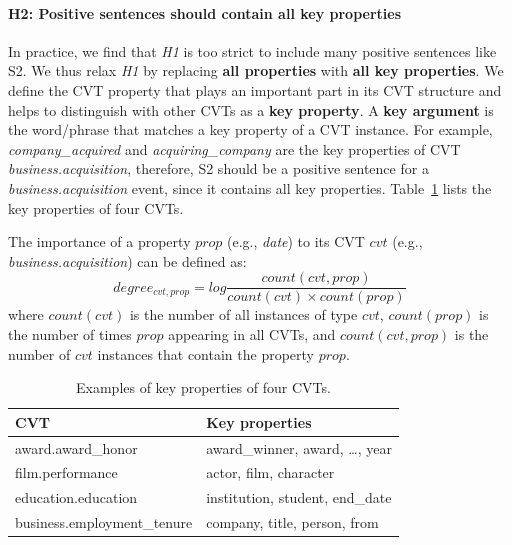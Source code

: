 
\paragraph{H2: Positive sentences should contain all key properties}
In practice, we find that \emph{H1} is too strict to include many positive sentences like S2. 
We thus relax \emph{H1} by replacing \textbf{all properties} with \textbf{all key properties}. We define the CVT property that plays an important part in its CVT structure and helps to distinguish with other CVTs as a \textbf{key property}. A \textbf{key argument} is the word/phrase that matches a key property of a CVT instance. For example, \emph{company\_acquired} and \emph{acquiring\_company} are the key properties of CVT \emph{business.acquisition}, therefore,  S2 should be a positive sentence for a \emph{business.acquisition} event, since it contains all key properties. Table~\ref{tab:5} lists the key properties of four CVTs.

The importance of a property $prop$ (e.g., \emph{date}) to its CVT $cvt$ (e.g., \emph{business.acquisition}) can be defined as:
\begin{equation}
	degree_{cvt, prop} = log \frac{count(cvt, prop)}{count(cvt) \times count(prop)} 
\end{equation}
where $count(cvt)$ is the number of all instances of type $cvt$, $count(prop)$ is the number of times $prop$ appearing in all CVTs, and $count(cvt, prop)$ is the number of $cvt$ instances that contain the property $prop$.

\begin{table}
\centering
\small
\begin{tabular}{|l|l|} \hline
CVT & Key properties \\ \hline
award.award\_honor & award\_winner, award, \ldots, year \\ \hline
film.performance & actor, film, character \\ \hline
education.education & institution, student, end\_date \\ \hline
business.employment\_tenure & company, title, person, from \\ \hline
\end{tabular}
\caption{Examples of key properties of four CVTs.\label{tab:5}}
\end{table}

